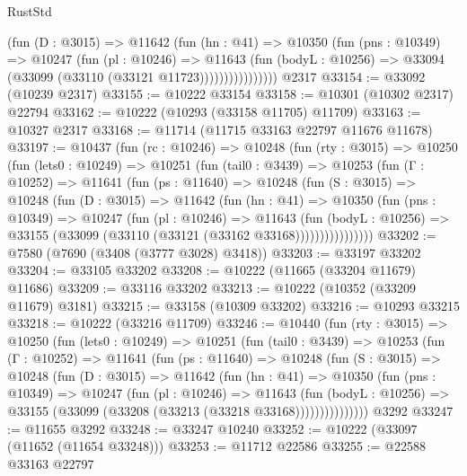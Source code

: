 \begin{lexlean}{RustStd}
\begin{coremodule}
                    (fun (D : @3015) =>
                    @11642
                      (fun (hn : @41) =>
                      @10350
                        (fun (pns : @10349) =>
                        @10247
                          (fun (pl : @10246) =>
                          @11643
                            (fun (bodyL : @10256) =>
                            @33094 (@33099 (@33110 (@33121 @11723))))))))))))))))
    @2317
@33154 := @33092 (@10239 @2317)
@33155 := @10222 @33154
@33158 := @10301 (@10302 @2317) @22794
@33162 := @10222 (@10293 (@33158 @11705) @11709)
@33163 := @10327 @2317
@33168 := @11714 (@11715 @33163 @22797 @11676 @11678)
@33197 := @10437
    (fun (rc : @10246) =>
    @10248
      (fun (rty : @3015) =>
      @10250
        (fun (lets0 : @10249) =>
        @10251
          (fun (tail0 : @3439) =>
          @10253
            (fun (Γ : @10252) =>
            @11641
              (fun (ps : @11640) =>
              @10248
                (fun (S : @3015) =>
                @10248
                  (fun (D : @3015) =>
                  @11642
                    (fun (hn : @41) =>
                    @10350
                      (fun (pns : @10349) =>
                      @10247
                        (fun (pl : @10246) =>
                        @11643
                          (fun (bodyL : @10256) =>
                          @33155 (@33099 (@33110 (@33121 (@33162 @33168))))))))))))))))
@33202 := @7580 (@7690 (@3408 (@3777 @3028) @3418))
@33203 := @33197 @33202
@33204 := @33105 @33202
@33208 := @10222 (@11665 (@33204 @11679) @11686)
@33209 := @33116 @33202
@33213 := @10222 (@10352 (@33209 @11679) @3181)
@33215 := @33158 (@10309 @33202)
@33216 := @10293 @33215
@33218 := @10222 (@33216 @11709)
@33246 := @10440
    (fun (rty : @3015) =>
    @10250
      (fun (lets0 : @10249) =>
      @10251
        (fun (tail0 : @3439) =>
        @10253
          (fun (Γ : @10252) =>
          @11641
            (fun (ps : @11640) =>
            @10248
              (fun (S : @3015) =>
              @10248
                (fun (D : @3015) =>
                @11642
                  (fun (hn : @41) =>
                  @10350
                    (fun (pns : @10349) =>
                    @10247
                      (fun (pl : @10246) =>
                      @11643
                        (fun (bodyL : @10256) =>
                        @33155 (@33099 (@33208 (@33213 (@33218 @33168)))))))))))))))
    @3292
@33247 := @11655 @3292
@33248 := @33247 @10240
@33252 := @10222 (@33097 (@11652 (@11654 @33248)))
@33253 := @11712 @22586
@33255 := @22588 @33163 @22797

\end{coremodule}
\end{lexlean}
